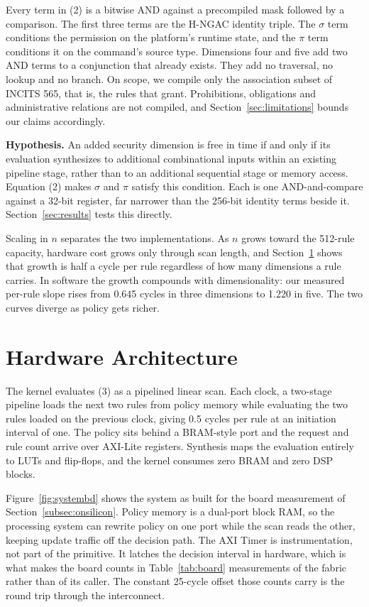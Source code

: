 \documentclass[conference]{IEEEtran}
\newcommand{\new}[1]{\textcolor{hkred}{#1}}
\begin{document}
Every term in (2) is a bitwise AND against a precompiled mask followed by a comparison. The first three terms are the H-NGAC identity triple. The $\sigma$ term conditions the permission on the platform's runtime state, and the $\pi$ term conditions it on the command's source type. Dimensions four and five add two AND terms to a conjunction that already exists. They add no traversal, no lookup and no branch. On scope, we compile only the association subset of INCITS 565, that is, the rules that grant. Prohibitions, obligations and administrative relations are not compiled, and Section~\ref{sec:limitations} bounds our claims accordingly.

\textbf{Hypothesis.} An added security dimension is free in time if and only if its evaluation synthesizes to additional combinational inputs within an existing pipeline stage, rather than to an additional sequential stage or memory access. Equation (2) makes $\sigma$ and $\pi$ satisfy this condition. Each is one AND-and-compare against a 32-bit register, far narrower than the 256-bit identity terms beside it. Section~\ref{sec:results} tests this directly.

Scaling in $n$ separates the two implementations. As $n$ grows toward the 512-rule capacity, hardware cost grows only through scan length, and Section~\ref{sec:arch} shows that growth is half a cycle per rule regardless of how many dimensions a rule carries. In software the growth compounds with dimensionality: our measured per-rule slope rises from 0.645 cycles in three dimensions to 1.220 in five. The two curves diverge as policy gets richer.

\section{Hardware Architecture}
\label{sec:arch}

The kernel evaluates (3) as a pipelined linear scan. Each clock, a two-stage pipeline loads the next two rules from policy memory while evaluating the two rules loaded on the previous clock, giving 0.5 cycles per rule at an initiation interval of one. The policy sits behind a BRAM-style port and the request and rule count arrive over AXI-Lite registers. Synthesis maps the evaluation entirely to LUTs and flip-flops, and the kernel consumes zero BRAM and zero DSP blocks.

\new{Figure~\ref{fig:systembd} shows the system as built for the board measurement of Section~\ref{subsec:onsilicon}. Policy memory is a dual-port block RAM, so the processing system can rewrite policy on one port while the scan reads the other, keeping update traffic off the decision path. The AXI Timer is instrumentation, not part of the primitive. It latches the decision interval in hardware, which is what makes the board counts in Table~\ref{tab:board} measurements of the fabric rather than of its caller. The constant 25-cycle offset those counts carry is the round trip through the interconnect.}
\end{document}
